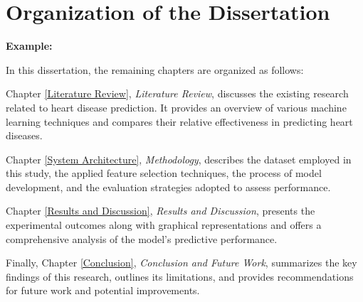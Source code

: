 \section{Organization of the Dissertation }

\textbf{\color{blue} Example:}

In this dissertation, the remaining chapters are organized as follows:

Chapter \ref{Literature Review}, \textit{Literature Review}, discusses the existing research related to heart disease prediction. It provides an overview of various machine learning techniques and compares their relative effectiveness in predicting heart diseases.

Chapter \ref{System Architecture}, \textit{Methodology}, describes the dataset employed in this study, the applied feature selection techniques, the process of model development, and the evaluation strategies adopted to assess performance.

Chapter \ref{Results and Discussion}, \textit{Results and Discussion}, presents the experimental outcomes along with graphical representations and offers a comprehensive analysis of the model's predictive performance.

Finally, Chapter \ref{Conclusion}, \textit{Conclusion and Future Work}, summarizes the key findings of this research, outlines its limitations, and provides recommendations for future work and potential improvements.
